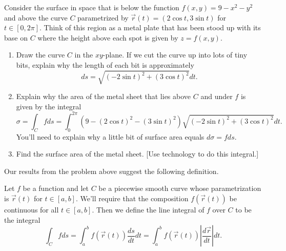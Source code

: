 \begin{problem}
%
%
 Consider the surface in space that is below the function 
$f(x,y)=9-x^2-y^2$ and above the curve $C$ parametrized by 
$\vec r(t)=(2\cos t, 3\sin t)$ for $t\in[0,2\pi]$.  Think of this region as a metal plate that has been stood up with its base on $C$ where the height above each spot is given by $z=f(x,y)$.
\begin{enumerate}
 \item {}%
  Draw the curve $C$ in the $xy$-plane. If we cut the curve up into lots of tiny bits, explain why the length of each bit is approximately $$ds=\sqrt{(-2\sin t)^2+(3\cos t)^2}dt.$$
 \item Explain why the area of the metal sheet that lies above $C$ and under $f$ is given by the integral
$$\sigma = \int_C f ds = \int_0^{2\pi}(9-(2\cos t)^2-(3\sin t)^2)\sqrt{(-2\sin t)^2+(3\cos t)^2}dt.$$
 You'll need to explain why a little bit of surface area equals $d\sigma =fds$. 
 \item
{}%
Find the surface area of the metal sheet. [Use technology to do this integral.] 
\end{enumerate}
\end{problem}






Our results from the problem above suggest the following definition.

\begin{definition}%
 Let $f$ be a function and let $C$ be a piecewise smooth curve whose parametrization is $\vec r(t)$ for $t\in[a,b]$. We'll require that the composition $f(\vec r(t))$ be continuous for all $t\in [a,b]$. Then we define the line integral
of $f$ over $C$ to be the integral 
$$\int_C f ds 
= \int_a^b f(\vec r(t))\frac{ds}{dt}dt
= \int_a^b f(\vec r(t))\left|\frac{d\vec r}{dt}\right|dt.$$
\end{definition}


